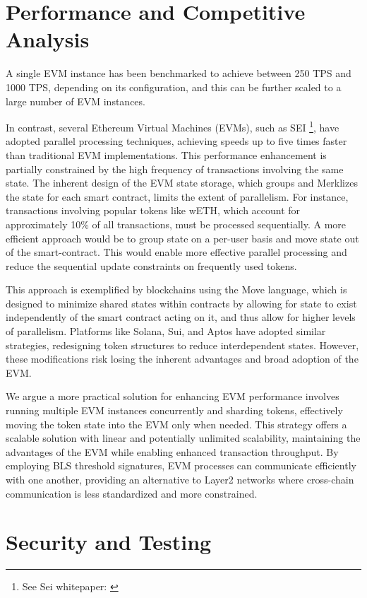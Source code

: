 \documentclass{article}
\begin{document}
\section{Performance and Competitive Analysis}

A single EVM instance has been benchmarked to achieve between 250 TPS and 1000 TPS, depending on its configuration, and this can be further scaled to a large number of EVM instances. 

In contrast, several Ethereum Virtual Machines (EVMs), such as SEI \footnote{See Sei whitepaper: \cite{sei}}, have adopted parallel processing techniques, achieving speeds up to five times faster than traditional EVM implementations. This performance enhancement is partially constrained by the high frequency of transactions involving the same state. The inherent design of the EVM state storage, which groups and Merklizes the state for each smart contract, limits the extent of parallelism. For instance, transactions involving popular tokens like wETH, which account for approximately 10\% of all transactions, must be processed sequentially. A more efficient approach would be to group state on a per-user basis and move state out of the smart-contract. This would enable more effective parallel processing and reduce the sequential update constraints on frequently used tokens.

This approach is exemplified by blockchains using the Move language, which is designed to minimize shared states within contracts by allowing for state to exist independently of the smart contract acting on it,  and thus allow for higher levels of parallelism. Platforms like Solana, Sui, and Aptos have adopted similar strategies, redesigning token structures to reduce interdependent states. However, these modifications risk losing the inherent advantages and broad adoption of the EVM.


We argue a more practical solution for enhancing EVM performance involves running multiple EVM instances concurrently and sharding tokens, effectively moving the token state into the EVM only when needed. This strategy offers a scalable solution with linear and potentially unlimited scalability, maintaining the advantages of the EVM while enabling enhanced transaction throughput. By employing BLS threshold signatures, EVM processes can communicate efficiently with one another, providing an alternative to Layer2 networks where cross-chain communication is less standardized and more constrained.


\section{Security and Testing}
\end{document}
